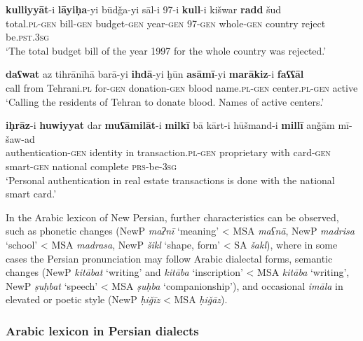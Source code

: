 \documentclass[output=paper]{langsci/langscibook}
\begin{document}
\ea
\ea 
\gll \textbf{kulliyyāt}-i \textbf{lāyiḥa}-yi būdǧa-yi sāl-i 97-i \textbf{kull}-i kišwar \textbf{radd} šud\\
total.\textsc{pl-gen} bill-\textsc{gen} budget-\textsc{gen} year-\textsc{gen} 97-\textsc{gen} whole-\textsc{gen} country reject be.\textsc{pst.3sg}\\
    \glt ‘The total budget bill of the year 1997 for the whole country was rejected.’

\ex 
\gll \textbf{daʕwat} {az} {tihrānīhā} barā-yi \textbf{ihdā}-yi ḫūn \textbf{asāmī}-yi \textbf{marākiz}-i \textbf{faʕʕāl}\\
call from Tehrani.\textsc{pl} for-\textsc{gen} donation-\textsc{gen} blood name.\textsc{pl-gen} center.\textsc{pl-gen} active\\
    \glt ‘Calling the residents of Tehran to donate blood. Names of active centers.’

\ex 
\gll \textbf{iḥrāz}-i \textbf{huwiyyat} dar \textbf{muʕāmilāt}-i \textbf{milkī} {bā} {kārt-i} hūšmand-i \textbf{millī} {anǧām} {mī-šaw-ad}\\
authentication-\textsc{gen} identity in transaction.\textsc{pl-gen} proprietary with card-\textsc{gen} smart-\textsc{gen} national complete \textsc{prs}-be-\textsc{3sg}\\ 
    \glt‘Personal authentication in real estate transactions is done with the national smart card.’
\z
\z


In the Arabic lexicon of New Persian, further characteristics can be observed, such as phonetic changes (NewP \textit{maʔnī} ‘meaning’ < MSA \textit{maʕnā}, NewP \textit{madrisa} ‘school’ < MSA \textit{madrasa}, NewP \textit{šikl} ‘shape, form’ < SA \textit{šakl}), where in some cases the Persian pronunciation may follow Arabic dialectal forms, semantic changes (NewP \textit{kitābat} ‘writing’ and \textit{kitāba} ‘inscription’ < MSA \textit{kitāba} ‘writing’, NewP \textit{ṣuḥbat} ‘speech’ < MSA \textit{ṣuḥba} ‘companionship’), and occasional \textit{imāla} in elevated or poetic style (NewP \textit{ḥiǧīz} < MSA \textit{ḥiǧāz}).

\subsubsection{Arabic lexicon in Persian dialects}
\end{document}
